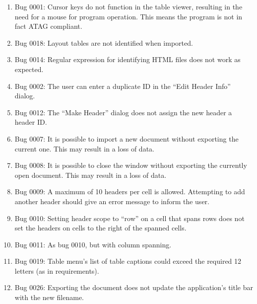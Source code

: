\begin{enumerate}

\item Bug 0001: Cursor keys do not function in the table viewer, resulting in
the need for a mouse for program operation. This means the program is not
in fact ATAG\cite{w3c:atag} compliant.

\item Bug 0018: Layout tables are not identified when imported.

\item Bug 0014: Regular expression for identifying HTML files does not work
as expected.

\item Bug 0002: The user can enter a duplicate ID in the ``Edit Header Info'' dialog.

\item Bug 0012: The ``Make Header'' dialog does not assign the new header a header
ID.

\item Bug 0007: It is possible to import a new document without exporting the current
one. This may result in a loss of data.

\item Bug 0008: It is possible to close the window without exporting the currently
open document. This may result in a loss of data.

\item Bug 0009: A maximum of 10 headers per cell is allowed. Attempting to add another
header should give an error message to inform the user.

\item Bug 0010: Setting header scope to ``row'' on a cell that spans rows does not
set the headers on cells to the right of the spanned cells.

\item Bug 0011: As bug 0010, but with column spanning.

\item Bug 0019: Table menu's list of table captions could exceed the required
12 letters (as in requirements).

\item Bug 0026: Exporting the document does not update the application's title bar
with the new filename.

\end{enumerate}

